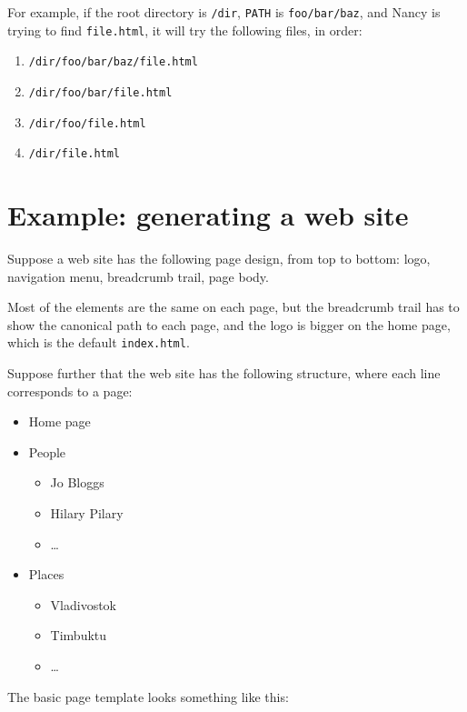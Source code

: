 \documentclass[a4paper,english]{scrartcl}
\begin{document}
For example, if the root directory is \verb|/dir|, \verb|PATH| is \verb|foo/bar/baz|, and Nancy is trying to find \verb|file.html|, it will try the following files, in order:

\begin{enumerate}
\item \verb|/dir/foo/bar/baz/file.html|
\item \verb|/dir/foo/bar/file.html|
\item \verb|/dir/foo/file.html|
\item \verb|/dir/file.html|
\end{enumerate}

\section{Example: generating a web site}

Suppose a web site has the following page design, from top to bottom: logo, navigation menu, breadcrumb trail, page body.

Most of the elements are the same on each page, but the breadcrumb trail has to show the canonical path to each page, and the logo is bigger on the home page, which is the default \verb|index.html|.

Suppose further that the web site has the following structure, where each line corresponds to a page:

\begin{itemize}
\item Home page
\item People
  \begin{itemize}
  \item Jo Bloggs
  \item Hilary Pilary
  \item \dots
  \end{itemize}
\item Places
  \begin{itemize}
  \item Vladivostok
  \item Timbuktu
  \item \dots
  \end{itemize}
\end{itemize}

The basic page template looks something like this:
\end{document}
